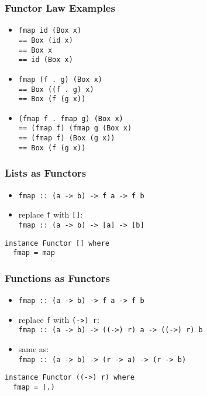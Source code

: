 \documentclass[dvipsnames]{beamer}
\theoremstyle{plain}
\begin{document}
\begin{frame}
  \frametitle{Functor Law Examples}

  \begin{itemize}
    \item \lstinline|fmap id (Box x)|\pause\\
      \lstinline|== Box (id x)|\pause\\
      \lstinline|== Box x|\pause\\
      \lstinline|== id (Box x)|

    \pause
    \bigskip
    \item \lstinline|fmap (f . g) (Box x)|\pause\\
      \lstinline|== Box ((f . g) x)|\pause\\
      \lstinline|== Box (f (g x))|
    \item \lstinline|(fmap f . fmap g) (Box x)|\pause\\
      \lstinline|== (fmap f) (fmap g (Box x)|\pause\\
      \lstinline|== (fmap f) (Box (g x))|\pause\\
      \lstinline|== Box (f (g x))|
  \end{itemize}
\end{frame}

\begin{frame}[fragile]
  \frametitle{Lists as Functors}

  \begin{itemize}
    \item \lstinline|fmap :: (a -> b) -> f a -> f b|
    \item replace \lstinline|f| with \lstinline|[]|:\\
      \lstinline|fmap :: (a -> b) -> [a] -> [b]|
  \end{itemize}

  \pause
  \begin{lstlisting}
instance Functor [] where
  fmap = map
  \end{lstlisting}
\end{frame}

\begin{frame}[fragile]
  \frametitle{Functions as Functors}

  \begin{itemize}
    \item \lstinline|fmap :: (a -> b) -> f a -> f b|
    \item replace \lstinline|f| with \lstinline|(->) r|:\\
      \lstinline|fmap :: (a -> b) -> ((->) r) a -> ((->) r) b|
    \item same as:\\
      \lstinline|fmap :: (a -> b) -> (r -> a) -> (r -> b)|
  \end{itemize}

  \pause
  \begin{lstlisting}
instance Functor ((->) r) where
  fmap = (.)
  \end{lstlisting}
\end{frame}
\end{document}
